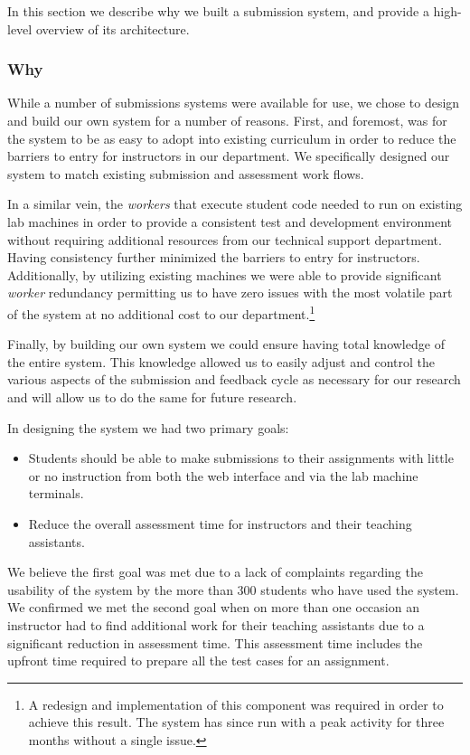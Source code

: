 In this section we describe why we built a submission system, and provide a
high-level overview of its architecture.

\subsubsection{Why}
While a number of submissions systems were available for use, we chose to
design and build our own system for a number of reasons. First, and foremost,
was for the system to be as easy to adopt into existing curriculum in order to
reduce the barriers to entry for instructors in our department. We specifically
designed our system to match existing submission and assessment work flows.

In a similar vein, the \emph{workers} that execute student code needed to run
on existing lab machines in order to provide a consistent test and development
environment without requiring additional resources from our technical support
department. Having consistency further minimized the barriers to entry for
instructors. Additionally, by utilizing existing machines we were able to
provide significant \emph{worker} redundancy permitting us to have zero issues
with the most volatile part of the system at no additional cost to our
department.\footnote{A redesign and implementation of this component was
  required in order to achieve this result. The system has since run with a
  peak activity for three months without a single issue.}

Finally, by building our own system we could ensure having total knowledge of
the entire system. This knowledge allowed us to easily adjust and control the
various aspects of the submission and feedback cycle as necessary for our
research and will allow us to do the same for future research.

In designing the system we had two primary goals:

\begin{itemize}
\item Students should be able to make submissions to their assignments with
  little or no instruction from both the web interface and via the lab machine
  terminals.
\item Reduce the overall assessment time for instructors and their teaching
  assistants.
\end{itemize}

We believe the first goal was met due to a lack of complaints regarding the
usability of the system by the more than 300 students who have used the
system. We confirmed we met the second goal when on more than one occasion an
instructor had to find additional work for their teaching assistants due to a
significant reduction in assessment time. This assessment time includes the
upfront time required to prepare all the test cases for an assignment.


